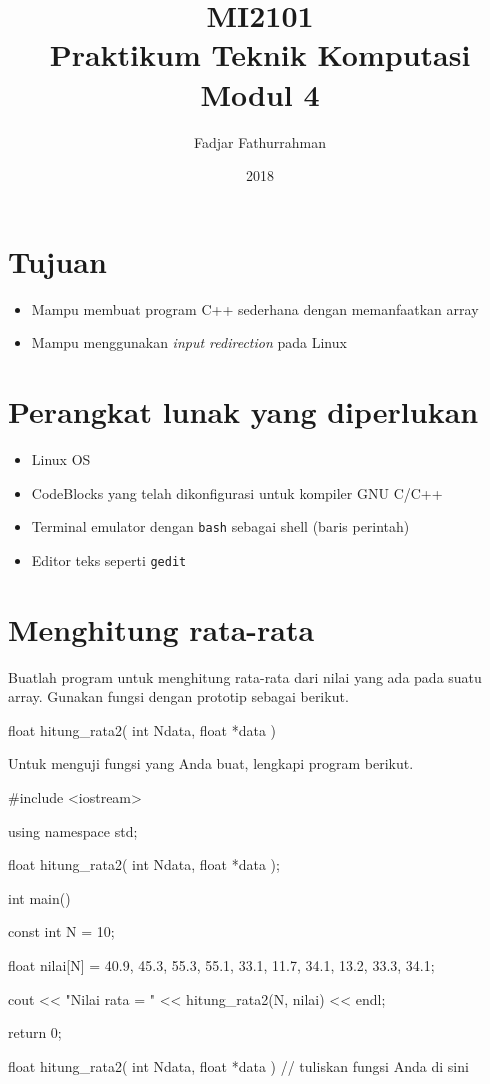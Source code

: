\documentclass[a4paper,11pt]{extarticle}
\title{
MI2101\\
Praktikum Teknik Komputasi\\
Modul 4}
\author{Fadjar Fathurrahman}
\date{2018}
\begin{document}
\maketitle

\section{Tujuan}
\begin{itemize}
\item Mampu membuat program C++ sederhana dengan memanfaatkan array
\item Mampu menggunakan \textit{input redirection} pada Linux
\end{itemize}

\section{Perangkat lunak yang diperlukan}
\begin{itemize}
\item Linux OS
\item CodeBlocks yang telah dikonfigurasi untuk kompiler GNU C/C++
\item Terminal emulator dengan \texttt{bash} sebagai shell (baris perintah)
\item Editor teks seperti \texttt{gedit}
\end{itemize}

\section{Menghitung rata-rata}

Buatlah program untuk menghitung rata-rata dari nilai yang ada pada
suatu array. Gunakan fungsi dengan prototip sebagai berikut.
\begin{cppcode}
float hitung_rata2( int Ndata, float *data )
\end{cppcode}

Untuk menguji fungsi yang Anda buat, lengkapi program berikut.
\begin{cppcode}
#include <iostream>

using namespace std;

float hitung_rata2( int Ndata, float *data );

int main()
{
  const int N = 10;

  float nilai[N] = {40.9, 45.3, 55.3, 55.1, 33.1,
                    11.7, 34.1, 13.2, 33.3, 34.1};
  
  cout << "Nilai rata = " << hitung_rata2(N, nilai) << endl;

  return 0;
}

float hitung_rata2( int Ndata, float *data )
{
  // tuliskan fungsi Anda di sini
}
\end{cppcode}
\end{document}
